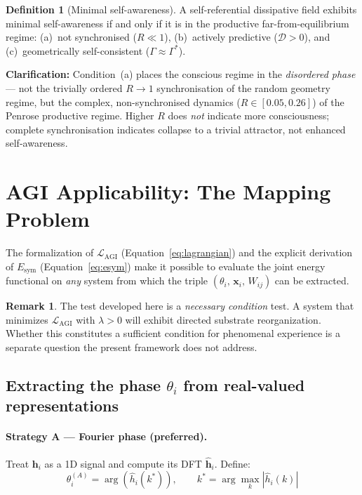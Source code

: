 \documentclass[12pt,a4paper]{article}
\theoremstyle{plain}
\theoremstyle{definition}
\newtheorem{definition}[theorem]{Definition}
\newtheorem{remark}[theorem]{Remark}
\begin{document}
\begin{definition}[Minimal self-awareness]
A self-referential dissipative field exhibits minimal self-awareness if and only if
it is in the productive far-from-equilibrium regime: (a)~not
synchronised ($R \ll 1$), (b)~actively predictive ($\mathcal{D} > 0$),
and (c)~geometrically self-consistent ($\Gamma \approx \Gamma^*$).

\textbf{Clarification:} Condition~(a) places the conscious regime in the
\emph{disordered phase} --- not the trivially ordered $R \to 1$ synchronisation
of the random geometry regime, but the complex, non-synchronised dynamics
($R \in [0.05, 0.26]$) of the Penrose productive regime. Higher $R$ does
\emph{not} indicate more consciousness; complete synchronisation indicates
collapse to a trivial attractor, not enhanced self-awareness.
\end{definition}

\section{AGI Applicability: The Mapping Problem}
\label{sec:agi_mapping}

The formalization of $\mathcal{L}_{\text{AGI}}$ (Equation~\ref{eq:lagrangian})
and the explicit derivation of $E_{\text{sym}}$ (Equation~\ref{eq:esym}) make it
possible to evaluate the joint energy functional on \emph{any} system from which
the triple $(\theta_i,\, \mathbf{x}_i,\, W_{ij})$ can be extracted.

\begin{remark}
The test developed here is a \emph{necessary condition} test. A system that
minimizes $\mathcal{L}_{\text{AGI}}$ with $\lambda > 0$ will exhibit directed
substrate reorganization. Whether this constitutes a sufficient condition for
phenomenal experience is a separate question the present framework does not
address.
\end{remark}

\subsection{Extracting the phase $\theta_i$ from real-valued representations}

\paragraph{Strategy A --- Fourier phase (preferred).}
Treat $\mathbf{h}_i$ as a 1D signal and compute its DFT $\hat{\mathbf{h}}_i$.
Define:
\begin{equation}
\theta_i^{(A)} = \arg\!\left(\hat{h}_i\!\left(k^*\right)\right),
\qquad k^* = \arg\max_k \left|\hat{h}_i(k)\right|
\end{equation}
\end{document}
